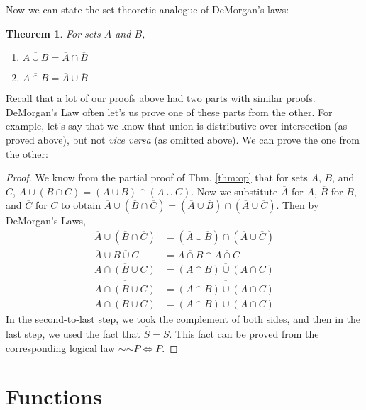 \documentclass[12pt]{article}
\newcommand*{\oldneg}{\mathord{\sim}}
\newcounter{thmc}
\newtheorem{thm}[thmc]{Theorem}
\begin{document}
Now we can state the set-theoretic analogue of DeMorgan's laws:

\begin{thm}
  For sets $A$ and $B$,
  \begin{enumerate}[label=\alph*)]
  \item $\overline{A\cup B}=\overline{A}\cap\overline{B}$
  \item $\overline{A\cap B}=\overline{A}\cup\overline{B}$
  \end{enumerate}
\end{thm}

Recall that a lot of our proofs above had two parts with similar
proofs.  DeMorgan's Law often let's us prove one of these parts from
the other.  For example, let's say that we know that union is
distributive over intersection (as proved above), but not \textit{vice
  versa} (as omitted above).  We can prove the one from the other:

\begin{proof}
  We know from the partial proof of Thm. \ref{thm:op} that for sets
  $A$, $B$, and $C$, $A\cup(B\cap C)=(A\cup B)\cap(A\cup C)$.  Now we
  substitute $\overline{A}$ for $A$, $\overline{B}$ for $B$, and
  $\overline{C}$ for $C$ to obtain $\overline{A}\cup(\overline{B}\cap
  \overline{C})=(\overline{A}\cup \overline{B})\cap(\overline{A}\cup
  \overline{C})$.  Then by DeMorgan's Laws,
  \begin{align*}
    \overline{A}\cup(\overline{B}\cap \overline{C}) &=
    (\overline{A}\cup\overline{B})\cap(\overline{A}\cup\overline{C})
    \\
    \overline{A}\cup\overline{B\cup C}&=\overline{A\cap
      B}\cap\overline{A\cap C} \\
    \overline{A\cap(B\cup C)}&=\overline{(A\cap B)\cup(A\cap C)}\\
    \overline{\overline{A\cap(B\cup C)}}&=\overline{\overline{(A\cap B)\cup(A\cap C)}}\\
    A\cap(B\cup C)&=(A\cap B)\cup(A\cap C)
  \end{align*}
  In the second-to-last step, we took the complement of both sides,
  and then in the last step, we used the fact that
  $\overline{\overline{S}}=S$.  This fact can be proved from the
  corresponding logical law $\oldneg\oldneg P \Leftrightarrow P$.
\end{proof}

\section{Functions}
\end{document}
